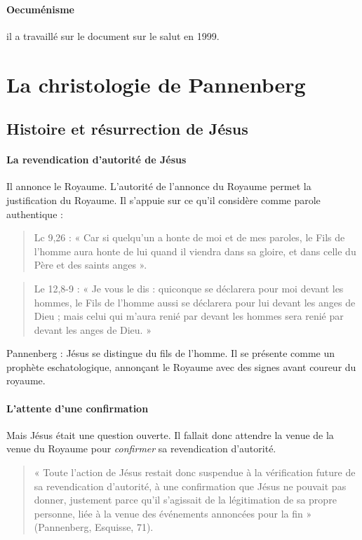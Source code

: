 \paragraph{Oecuménisme} il a travaillé sur le document sur le salut en 1999. 


\section{La christologie de Pannenberg}

 \subsection{Histoire et résurrection de Jésus}

\paragraph{La revendication d’autorité de Jésus} Il annonce le Royaume. L'autorité de l'annonce du Royaume permet la justification du Royaume. Il s'appuie sur ce qu'il considère comme parole authentique : 
\begin{quote}
    Lc 9,26 : « Car si quelqu’un a honte de moi et de mes paroles, le Fils de l’homme aura honte
de lui quand il viendra dans sa gloire, et dans celle du Père et des saints anges ».
\end{quote}
\begin{quote}
    Le 12,8-9 : « Je vous le dis : quiconque se déclarera pour moi devant les hommes, le Fils de
l’homme aussi se déclarera pour lui devant les anges de Dieu ; mais celui qui m’aura renié par
devant les hommes sera renié par devant les anges de Dieu. »
\end{quote}
Pannenberg : Jésus se distingue du fils de l'homme. Il se présente comme un prophète eschatologique, annonçant le Royaume avec des signes avant coureur du royaume.  

\paragraph{L’attente d’une confirmation} Mais Jésus était une question ouverte. Il fallait donc attendre la venue de la venue du Royaume pour \textit{confirmer} sa revendication d'autorité. 
\begin{quote}
    « Toute l’action de Jésus restait donc suspendue à la vérification future de sa revendication
d’autorité, à une confirmation que Jésus ne pouvait pas donner, justement parce qu’il
s’agissait de la légitimation de sa propre personne, liée à la venue des événements annoncées
pour la fin » (Pannenberg, Esquisse, 71).
\end{quote}

